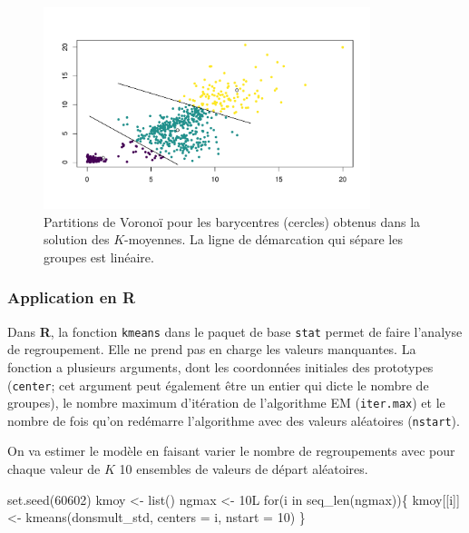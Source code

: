 \documentclass[
  11pt,
  letterpaper,
]{scrbook}
\newenvironment{Shaded}{\begin{snugshade}}{\end{snugshade}}
\newcommand{\AttributeTok}[1]{\textcolor[rgb]{0.40,0.45,0.13}{#1}}
\newcommand{\ControlFlowTok}[1]{\textcolor[rgb]{0.00,0.23,0.31}{#1}}
\newcommand{\DecValTok}[1]{\textcolor[rgb]{0.68,0.00,0.00}{#1}}
\newcommand{\FunctionTok}[1]{\textcolor[rgb]{0.28,0.35,0.67}{#1}}
\newcommand{\NormalTok}[1]{\textcolor[rgb]{0.00,0.23,0.31}{#1}}
\newcommand{\OtherTok}[1]{\textcolor[rgb]{0.00,0.23,0.31}{#1}}
\theoremstyle{definition}
\theoremstyle{remark}
\begin{document}
\begin{figure}[ht!]

{\centering \includegraphics[width=0.85\textwidth,height=\textheight]{regroupements_files/figure-pdf/fig-voronoikmoy-1.pdf}

}

\caption{\label{fig-voronoikmoy}Partitions de Voronoï pour les
barycentres (cercles) obtenus dans la solution des \(K\)-moyennes. La
ligne de démarcation qui sépare les groupes est linéaire.}

\end{figure}

\hypertarget{application-en-r}{%
\subsubsection{\texorpdfstring{Application en
\textbf{R}}{Application en R}}\label{application-en-r}}

Dans \textbf{R}, la fonction \texttt{kmeans} dans le paquet de base
\texttt{stat} permet de faire l'analyse de regroupement. Elle ne prend
pas en charge les valeurs manquantes. La fonction a plusieurs arguments,
dont les coordonnées initiales des prototypes (\texttt{center}; cet
argument peut également être un entier qui dicte le nombre de groupes),
le nombre maximum d'itération de l'algorithme EM (\texttt{iter.max}) et
le nombre de fois qu'on redémarre l'algorithme avec des valeurs
aléatoires (\texttt{nstart}).

On va estimer le modèle en faisant varier le nombre de regroupements
avec pour chaque valeur de \(K\) 10 ensembles de valeurs de départ
aléatoires.

\begin{Shaded}
\begin{Highlighting}[]
\FunctionTok{set.seed}\NormalTok{(}\DecValTok{60602}\NormalTok{)}
\NormalTok{kmoy }\OtherTok{\textless{}{-}} \FunctionTok{list}\NormalTok{()}
\NormalTok{ngmax }\OtherTok{\textless{}{-}}\NormalTok{ 10L}
\ControlFlowTok{for}\NormalTok{(i }\ControlFlowTok{in} \FunctionTok{seq\_len}\NormalTok{(ngmax))\{}
\NormalTok{ kmoy[[i]] }\OtherTok{\textless{}{-}} \FunctionTok{kmeans}\NormalTok{(donsmult\_std,}
                     \AttributeTok{centers =}\NormalTok{ i,}
                     \AttributeTok{nstart =} \DecValTok{10}\NormalTok{)}
\NormalTok{\}}
\end{Highlighting}
\end{Shaded}
\end{document}
